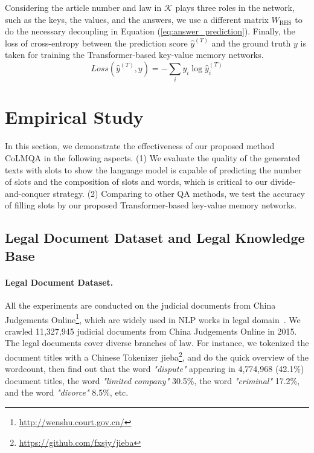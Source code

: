 \documentclass{article}
\begin{document}
Considering the article number and law in $\mathcal{K}$ plays three roles in the network, such as the keys, the values, and the answers, we use a different matrix $W_{\text{RHS}}$ to do the necessary decoupling in Equation (\ref{eq:answer_prediction}).
Finally, the loss of cross-entropy between the prediction score $\hat{y}^{(T)}$ and the ground truth $y$ is taken for training the Transformer-based key-value memory networks. 
\begin{equation}
Loss(\hat{y}^{(T)}, y) = - \sum_{i} y_i \log \hat{y}^{(T)}_i
\end{equation}

\section{Empirical Study}
In this section, we demonstrate the effectiveness of our proposed method CoLMQA in the following aspects.
(1) We evaluate the quality of the generated texts with slots to show the language model is capable of predicting the number of slots and the composition of slots and words, which is critical to our divide-and-conquer strategy. 
(2) Comparing to other QA methods, we test the accuracy of filling slots by our proposed Transformer-based key-value memory networks. 

\subsection{Legal Document Dataset and Legal Knowledge Base}
\label{sec:legal_documents}
\paragraph{Legal Document Dataset.} 
All the experiments are conducted on the judicial documents from China Judgements Online\footnote{\url{http://wenshu.court.gov.cn/}}, which are widely used in NLP works in legal domain~\cite{luo2017learning_charge,ye-etal-2018-interpretable_courtviews}. 
We crawled 11,327,945 judicial documents from China Judgements Online in 2015. 
The legal documents cover diverse branches of law. 
For instance, we tokenized the document titles with a Chinese Tokenizer jieba\footnote{\url{https://github.com/fxsjy/jieba}}, and do the quick overview of the wordcount, then find out that the word \textit{"dispute"} appearing in 4,774,968 (42.1\%) document titles, the word \textit{"limited company"} 30.5\%, the word \textit{"criminal"} 17.2\%, and the word \textit{"divorce"} 8.5\%, etc. 
\end{document}
